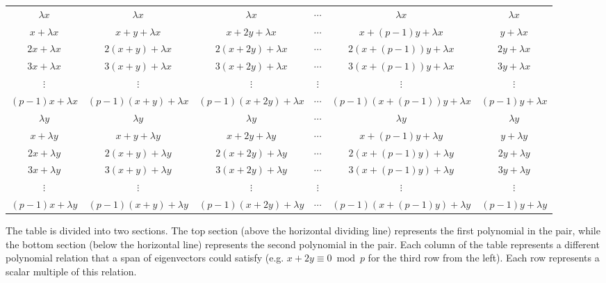 \documentclass[a4paper, 12pt, reqno]{amsart}
\begin{document}
	{\tiny
		\begin{center}
			\begin{tabular}{*{5}{c|}c}
				$\lambda x$        & $\lambda x$            & $\lambda x$             & $\cdots$ & $\lambda x$                 & $\lambda x$        \\
				$x+\lambda x$      & $x+y+\lambda x$        & $x+2y+\lambda x$        & $\cdots$ & $x+(p-1)y+\lambda x$        & $y+\lambda x$      \\
				$2x+\lambda x$     & $2(x+y)+\lambda x$     & $2(x+2y)+\lambda x$     & $\cdots$ & $2(x+(p-1))y+\lambda x$     & $2y+\lambda x$     \\
				$3x+\lambda x$     & $3(x+y)+\lambda x$     & $3(x+2y)+\lambda x$     & $\cdots$ & $3(x+(p-1))y+\lambda x$     & $3y+\lambda x$     \\
				$\vdots$           & $\vdots$               & $\vdots$                & $\vdots$ & $\vdots$                    & $\vdots$           \\
				$(p-1)x+\lambda x$ & $(p-1)(x+y)+\lambda x$ & $(p-1)(x+2y)+\lambda x$ & $\cdots$ & $(p-1)(x+(p-1))y+\lambda x$ & $(p-1)y+\lambda x$ \\
				\hline 
				$\lambda y$        & $\lambda y$            & $\lambda y$             & $\cdots$ & $\lambda y$                 & $\lambda y$        \\
				$x+\lambda y$      & $x+y+\lambda y$        & $x+2y+\lambda y$        & $\cdots$ & $x+(p-1)y+\lambda y$        & $y+\lambda y$      \\
				$2x+\lambda y$     & $2(x+y)+\lambda y$     & $2(x+2y)+\lambda y$     & $\cdots$ & $2(x+(p-1)y)+\lambda y$     & $2y+\lambda y$     \\
				$3x+\lambda y$     & $3(x+y)+\lambda y$     & $3(x+2y)+\lambda y$     & $\cdots$ & $3(x+(p-1)y)+\lambda y$     & $3y+\lambda y$     \\
				$\vdots$           & $\vdots$               & $\vdots$                & $\vdots$ & $\vdots$                    & $\vdots$           \\
				$(p-1)x+\lambda y$ & $(p-1)(x+y)+\lambda y$ & $(p-1)(x+2y)+\lambda y$ & $\cdots$ & $(p-1)(x+(p-1)y)+\lambda y$ & $(p-1)y+\lambda y$ 
				
			\end{tabular}
		\end{center}
	}
	
	The table is divided into two sections. The top section (above the horizontal dividing line) represents the first polynomial in the pair, while the bottom section (below 
	the horizontal line) represents the second polynomial in the pair. Each column of the table represents a different polynomial relation that a span of eigenvectors could 
	satisfy (e.g. $x+2y\equiv0\bmod{p}$ for the third row from the left). Each row represents a scalar multiple of this relation.
	
\end{document}
